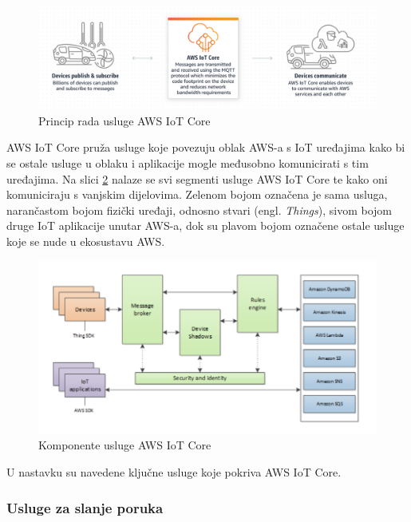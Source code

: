 \begin{figure}[ht]
	\centering
	\includegraphics[scale=0.6]{imgs/aws_iot_core_overview}
	\caption{Princip rada usluge AWS IoT Core \cite{aws_docs}}
	\label{fig:aws_iot_core_overview}
\end{figure}

AWS IoT Core pruža usluge koje povezuju oblak AWS-a s IoT uređajima kako bi se ostale usluge u oblaku i aplikacije mogle međusobno komunicirati s tim uređajima. Na slici \ref{fig:aws_iot_core_components} nalaze se svi segmenti usluge AWS IoT Core te kako oni komuniciraju s vanjskim dijelovima. Zelenom bojom označena je sama usluga, narančastom bojom fizički uređaji, odnosno stvari (engl. \textit{Things}), sivom bojom druge IoT aplikacije unutar AWS-a, dok su plavom bojom označene ostale usluge koje se nude u ekosustavu AWS.

\begin{figure}[ht]
	\centering
	\includegraphics[scale=0.6]{imgs/aws_iot_core_components}
	\caption{Komponente usluge AWS IoT Core \cite{aws_docs}}
	\label{fig:aws_iot_core_components}
\end{figure}

U nastavku su navedene ključne usluge koje pokriva AWS IoT Core.

\subsubsection{Usluge za slanje poruka}

